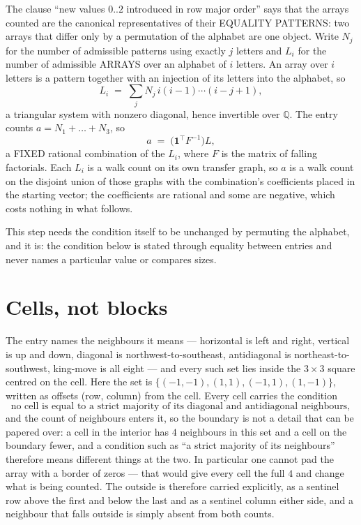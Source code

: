 \documentclass[11pt,a4paper]{article}
\theoremstyle{plain}
\theoremstyle{definition}
\begin{document}
The clause ``new values $0..2$ introduced in row major order'' says that the arrays
counted are the canonical representatives of their EQUALITY PATTERNS: two arrays that differ
only by a permutation of the alphabet are one object. Write $N_j$ for the number of admissible
patterns using exactly $j$ letters and $L_i$ for the number of admissible ARRAYS over an
alphabet of $i$ letters. An array over $i$ letters is a pattern together with an injection of
its letters into the alphabet, so
\[
L_i\;=\;\sum_{j}N_j\,i(i-1)\cdots(i-j+1),
\]
a triangular system with nonzero diagonal, hence invertible over $\mathbb{Q}$. The entry
counts $a=N_1+\dots+N_{3}$, so
\[
a\;=\;\bigl(\mathbf{1}^{\!\top}F^{-1}\bigr)L ,
\]
a FIXED rational combination of the $L_i$, where $F$ is the matrix of falling factorials.
Each $L_i$ is a walk count on its own transfer graph, so $a$ is a walk count on the disjoint
union of those graphs with the combination's coefficients placed in the starting vector; the
coefficients are rational and some are negative, which costs nothing in what follows.

This step needs the condition itself to be unchanged by permuting the alphabet, and it is:
the condition below is stated through equality between entries and never names a particular
value or compares sizes.

\section{Cells, not blocks}

The entry names the neighbours it means --- horizontal is left and right, vertical is up and
down, diagonal is northwest-to-southeast, antidiagonal is northeast-to-southwest, king-move is
all eight --- and every such set lies inside the $3\times3$ square centred on the cell. Here
the set is $\{(-1,-1), (1,1), (-1,1), (1,-1)\}$, written as offsets (row, column) from the cell. Every cell carries
the condition
\[
\text{no cell is equal to a strict majority of its diagonal and antidiagonal neighbours},
\]
and the count of neighbours enters it, so the boundary is not a detail that can be papered
over: a cell in the interior has $4$ neighbours in this set and a cell on the boundary
fewer, and a condition such as ``a strict majority of its neighbours'' therefore means
different things at the two. In particular one cannot pad the array with a border of zeros ---
that would give every cell the full $4$ and change what is being counted. The outside is
therefore carried
explicitly, as a sentinel row above the first and below the last and as a sentinel column
either side, and a neighbour that falls outside is simply absent from both counts.
\end{document}
